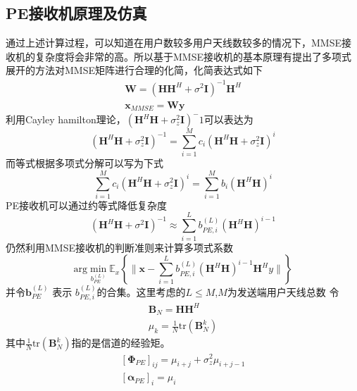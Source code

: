 \documentclass[bachelor,nocolorlinks, printoneside]{seuthesis} %
\begin{document}
\begin{Main}
\section{PE接收机原理及仿真}
通过上述计算过程，可以知道在用户数较多用户天线数较多的情况下，MMSE接收机的复杂度将会非常的高\cite{LuAnAn}。所以基于MMSE接收机的基本原理有提出了多项式展开的方法对MMSE矩阵进行合理的化简，化简表达式如下
\begin{gather}\label{key}
\mathbf{W} = (\mathbf{H}\mathbf{H}^H + \sigma^2 \mathbf{I})^{-1}\mathbf{H}^H  \nonumber \\
\mathbf{x}_{MMSE} = \mathbf{W} \mathbf{y}  
\end{gather}
利用Cayley hamilton理论，$(\mathbf{H}^H\mathbf{H}+\sigma_z^2\mathbf{I})^-1$可以表达为
\begin{equation}\label{key}
(\mathbf{H}^H\mathbf{H}+\sigma^2_z\mathbf{I})^{-1} = \sum_{i=1}^M c_i(\mathbf{H}^H \mathbf{H}+\sigma^2_z\mathbf{I})^i
\end{equation}
而等式根据多项式分解可以写为下式
\begin{equation}\label{key}
\sum_{i=1}^M c_i(\mathbf{H}^H \mathbf{H}+\sigma^2_z\mathbf{I})^i=\sum_{i=1}^M b_i(\mathbf{H}^H\mathbf{H})^i
\end{equation}
PE接收机可以通过约等式降低复杂度
\begin{equation}\label{key}
(\mathbf{H}^H\mathbf{H}+\sigma^2\mathbf{I})^{-1} \approx \sum_{i=1}^{L} b_{PE,i}^{(L)}(\mathbf{H}^H\mathbf{H})^{i-1}
\end{equation}
仍然利用MMSE接收机的判断准则来计算多项式系数
\begin{equation}\label{key}
\mathrm{arg} \min_{b_{PE}^{(L)}} \mathbb{E}_x \left\lbrace \| \mathbf{x}-\sum_{i=1}^{L}b_{PE,i}^{(L)}(\mathbf{H}^H\mathbf{H})^{i-1}\mathbf{H}^Hy \| \right\rbrace
\end{equation}
并令$\mathbf{b}^{(L)}_{PE}$ 表示 $b_{PE,i}^{(L)}$的合集。这里考虑的$L \leq M$,$M$为发送端用户天线总数
令
\begin{gather}\label{key}
\mathbf{B}_N = \mathbf{H}\mathbf{H}^H \nonumber \\
\mu_k = \frac{1}{N} \mathrm{tr}(\mathbf{B}_N^k) \nonumber
\end{gather}
其中$\frac{1}{N} \mathrm{tr}(\mathbf{B}_N^k)$指的是信道的经验矩。
\begin{gather}\label{key}
[\mathbf{\Phi}_{PE}]_{ij} = \mu_{i+j} + \sigma_{z}^2 \mu_{i+j-1} \nonumber \\
\left[\mathbf{\alpha}_{PE}\right]_i = \mu_i
\end{gather}


\end{Main}
\end{document}
